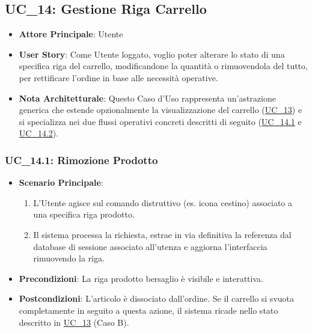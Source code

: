 
\subsection{UC\_14: Gestione Riga Carrello}
\label{uc_14}

\begin{itemize}
    \item \textbf{Attore Principale}: Utente
    \item \textbf{User Story}: Come Utente loggato, voglio poter alterare lo stato di una specifica riga del carrello, modificandone la quantità o rimuovendola del tutto, per rettificare l'ordine in base alle necessità operative.
    \item \textbf{Nota Architetturale}: Questo Caso d'Uso rappresenta un'astrazione generica che estende opzionalmente la visualizzazione del carrello (\hyperref[uc_13]{UC\_13}) e si specializza nei due flussi operativi concreti descritti di seguito (\hyperref[uc_14.1]{UC\_14.1} e \hyperref[uc_14.2]{UC\_14.2}).
\end{itemize}

\subsubsection{UC\_14.1: Rimozione Prodotto}
\label{uc_14.1}
\begin{itemize}
    \item \textbf{Scenario Principale}: 
    \begin{enumerate}
        \item L'Utente agisce sul comando distruttivo (es. icona cestino) associato a una specifica riga prodotto.
        \item Il sistema processa la richiesta, estrae in via definitiva la referenza dal database di sessione associato all'utenza e aggiorna l'interfaccia rimuovendo la riga.
    \end{enumerate}
    \item \textbf{Precondizioni}: La riga prodotto bersaglio è visibile e interattiva.
    \item \textbf{Postcondizioni}: L'articolo è dissociato dall'ordine. Se il carrello si svuota completamente in seguito a questa azione, il sistema ricade nello stato descritto in \hyperref[uc_13]{UC\_13} (Caso B).
\end{itemize}

